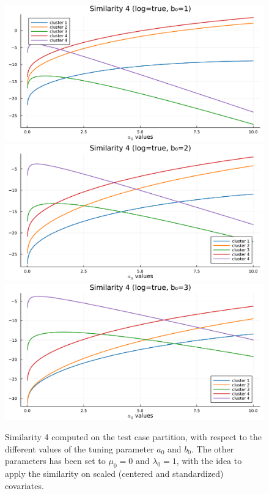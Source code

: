 \documentclass[12pt,	%
	a4paper,		%
	twoside,		%
	openright,		%
	titlepage,%
	]{book}
\theoremstyle{definition}
\begin{document}
\begin{figure}[!p]
    \centering
    \includegraphics[width=1\linewidth]{model description/covariate similarity analysis//test case on 5 clusters/similarity4_lambda1_bc1.pdf}
    \includegraphics[width=1\linewidth]{model description/covariate similarity analysis//test case on 5 clusters/similarity4_lambda1_bc2.pdf}
    \includegraphics[width=1\linewidth]{model description/covariate similarity analysis//test case on 5 clusters/similarity4_lambda1_bc3.pdf}
    \caption[Similarity 4 illustration]{Similarity 4 computed on the test case partition, with respect to the different values of the tuning parameter $a_0$ and $b_0$. The other parameters has been set to $\mu_0=0$ and $\lambda_0=1$, with the idea to apply the similarity on scaled (centered and standardized) covariates.}
    \label{fig: sim4}
\end{figure}
\end{document}
